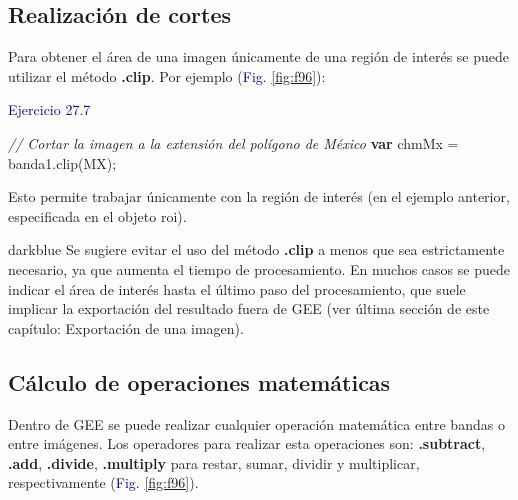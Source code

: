 \documentclass[
  12pt,
  letterpaper,
  twoside]{book}
\newenvironment{Shaded}{\begin{snugshade}}{\end{snugshade}}
\newcommand{\CommentTok}[1]{\textcolor[rgb]{0.24,0.58,0.00}{\textit{#1}}}
\newcommand{\FunctionTok}[1]{\textcolor[rgb]{0.48,0.12,0.64}{#1}}
\newcommand{\KeywordTok}[1]{\textcolor[rgb]{0.00,0.00,0.00}{\textbf{#1}}}
\newcommand{\NormalTok}[1]{#1}
\newcommand{\OperatorTok}[1]{\textcolor[rgb]{0.00,0.00,0.00}{#1}}
\newcommand\boldpurple[1]{\textcolor{darkpurple}{\textbf{#1}}}
\begin{document}
\hypertarget{realizaciuxf3n-de-cortes}{%
\subsection*{Realización de cortes}\label{realizaciuxf3n-de-cortes}}

Para obtener el área de una imagen únicamente de una región de interés se puede utilizar el método \boldpurple{.clip}. Por ejemplo (\textcolor{darkblue}{Fig.} \ref{fig:f96}):

\textcolor{darkblue}{Ejercicio 27.7}

\begin{Shaded}
\begin{Highlighting}[]
\CommentTok{// Cortar la imagen a la extensión del polígono de México}
\KeywordTok{var}\NormalTok{ chmMx }\OperatorTok{=}\NormalTok{ banda1}\OperatorTok{.}\FunctionTok{clip}\NormalTok{(MX)}\OperatorTok{;}
\end{Highlighting}
\end{Shaded}

Esto permite trabajar únicamente con la región de interés (en el ejemplo anterior, especificada en el objeto roi).

\begin{bluebox2}

\begin{awesomeblock}{5pt}{\faLightbulb}{darkblue}
Se sugiere evitar el uso del método \boldpurple{.clip} a menos que sea estrictamente necesario, ya que aumenta el tiempo de procesamiento. En muchos casos se puede indicar el área de interés hasta el último paso del procesamiento, que suele implicar la exportación del resultado fuera de GEE (ver última sección de este capítulo: Exportación de una imagen).

\end{awesomeblock}

\end{bluebox2}

\hypertarget{cuxe1lculo-de-operaciones-matemuxe1ticas}{%
\subsection*{Cálculo de operaciones matemáticas}\label{cuxe1lculo-de-operaciones-matemuxe1ticas}}

Dentro de GEE se puede realizar cualquier operación matemática entre bandas o entre imágenes. Los operadores para realizar esta operaciones son: \boldpurple{.subtract}, \boldpurple{.add}, \boldpurple{.divide}, \boldpurple{.multiply} para restar, sumar, dividir y multiplicar, respectivamente (\textcolor{darkblue}{Fig.} \ref{fig:f96}).
\end{document}
